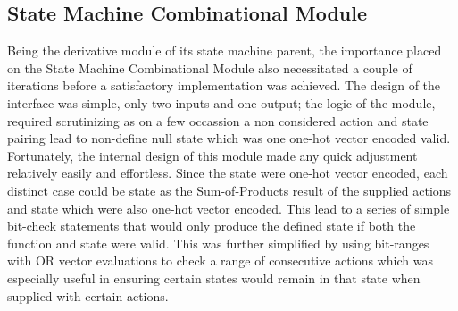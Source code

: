 \documentclass[stu,12pt,floatsintext]{apa7}
\begin{document}
\subsection{State Machine Combinational Module}
\label{subsec:state_machine_combinational_module}

Being the derivative module of its state machine parent, the importance placed on the State Machine Combinational Module also necessitated a couple of iterations before a satisfactory implementation was achieved. The design of the interface was simple, only two inputs and one output; the logic of the module, required scrutinizing as on a few occassion a non considered action and state pairing lead to non-define null state which was one one-hot vector encoded valid. Fortunately, the internal design of this module made any quick adjustment relatively easily and effortless. Since the state were one-hot vector encoded, each distinct case could be state as the Sum-of-Products result of the supplied actions and state which were also one-hot vector encoded. This lead to a series of simple bit-check statements that would only produce the defined state if both the function and state were valid. This was further simplified by using bit-ranges with OR vector evaluations to check a range of consecutive actions which was especially useful in ensuring certain states would remain in that state when supplied with certain actions.

%
%
\end{document}
